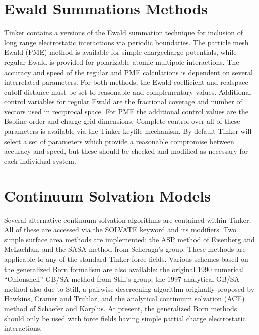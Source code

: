 \documentclass[letterpaper,11pt,english]{sphinxmanual}
\begin{document}
\section{Ewald Summations Methods}
\label{\detokenize{text/special-features:ewald-summations-methods}}
Tinker contains a versions of the Ewald summation technique for inclusion of long range electrostatic interactions via periodic boundaries. The particle mesh Ewald (PME) method is available for simple charge\sphinxhyphen{}charge potentials, while regular Ewald is provided for polarizable atomic multipole interactions. The accuracy and speed of the regular and PME calculations is dependent on several interrelated parameters. For both methods, the Ewald coefficient and real\sphinxhyphen{}space cutoff distance must be set to reasonable and complementary values. Additional control variables for regular Ewald are the fractional coverage and number of vectors used in reciprocal space. For PME the additional control values are the B\sphinxhyphen{}spline order and charge grid dimensions. Complete control over all of these parameters is available via the Tinker keyfile mechanism. By default Tinker will select a set of parameters which provide a reasonable compromise between accuracy and speed, but these should be checked and modified as necessary for each individual system.


\section{Continuum Solvation Models}
\label{\detokenize{text/special-features:continuum-solvation-models}}
Several alternative continuum solvation algorithms are contained within Tinker. All of these are accessed via the SOLVATE keyword and its modifiers. Two simple surface area methods are implemented: the ASP method of Eisenberg and McLachlan, and the SASA method from Scheraga’s group. These methods are applicable to any of the standard Tinker force fields. Various schemes based on the generalized Born formalism are also available: the original 1990 numerical “Onion\sphinxhyphen{}shell” GB/SA method from Still’s group, the 1997 analytical GB/SA method also due to Still, a pairwise descreening algorithm originally proposed by Hawkins, Cramer and Truhlar, and the analytical continuum solvation (ACE) method of Schaefer and Karplus. At present, the generalized Born methods should only be used with force fields having simple partial charge electrostatic interactions.
\end{document}
